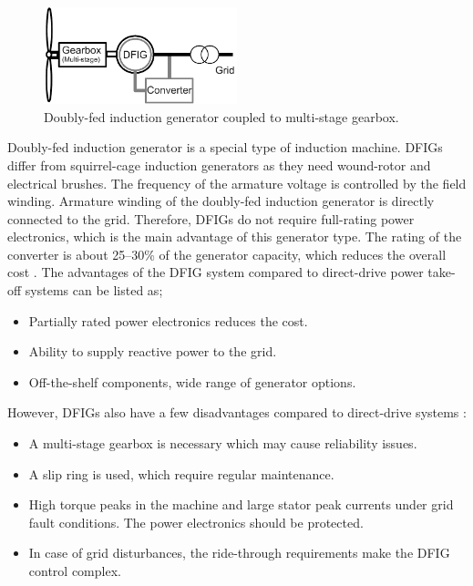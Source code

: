 \documentclass[a4paper, 11pt]{article} %
\begin{document}
  \begin{figure}[h]
    \centering
    \includegraphics[width=0.5\textwidth]{DFIG_3G}
    \caption{Doubly-fed induction generator coupled to multi-stage gearbox.} 
    \label{dfig_3g}
  \end{figure}

Doubly-fed induction generator is a special type of induction machine. DFIGs differ from squirrel-cage induction generators as they need wound-rotor and electrical brushes. The frequency of the armature voltage is controlled by the field winding. Armature winding of the doubly-fed induction generator is directly connected to the grid. Therefore, DFIGs do not require full-rating power electronics, which is the main advantage of this generator type. The rating of the converter is about 25--30\% of the generator capacity, which reduces the overall cost \cite{Li2008a}.
The advantages of the DFIG system compared to direct-drive power take-off systems can be listed as;

\begin{itemize}
	\item Partially rated power electronics reduces the cost.
	\item Ability to supply reactive power to the grid.
	\item Off-the-shelf components, wide range of generator options.
\end{itemize}

However, DFIGs also have a few disadvantages compared to direct-drive systems \cite{Li2008a}:

\begin{itemize}
	\item A multi-stage gearbox is necessary which may cause reliability issues.
	\item A slip ring is used, which require regular maintenance.
	\item High torque peaks in the machine and large stator peak currents under grid fault conditions. The power electronics should be protected.
	\item In case of grid disturbances, the ride-through requirements make the DFIG control complex.
\end{itemize}
\end{document}
